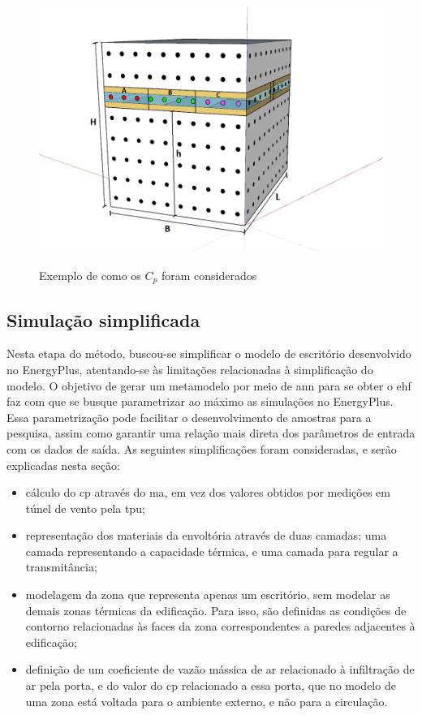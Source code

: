 \documentclass[brazil,hardcopy,openany]{ufscthesis} %
\begin{document}
\begin{figure}[h]
	\centering
	\caption{Exemplo de como os $C_p$ foram considerados}
	\includegraphics[width=.8\linewidth]{img/ex_TPU_h.png}
	\label{fig:tpuwindows}
\end{figure}


\subsection{Simulação simplificada}

Nesta etapa do método, buscou-se simplificar o modelo de escritório desenvolvido no EnergyPlus, atentando-se às limitações relacionadas à simplificação do modelo.
O objetivo de gerar um metamodelo por meio de \acrfull{ann} para se obter o \acrshort{ehf} faz com que se busque parametrizar ao máximo as simulações no EnergyPlus.
Essa parametrização pode facilitar o desenvolvimento de amostras para a pesquisa, assim como garantir uma relação mais direta dos parâmetros de entrada com os dados de saída. 
As seguintes simplificações foram consideradas, e serão explicadas nesta seção:

\begin{itemize}
	\item cálculo do \acrshort{cp} através do \acrlong{ma}, em vez dos valores obtidos por medições em túnel de vento pela \acrshort{tpu};
	\item representação dos materiais da envoltória através de duas camadas: uma camada representando a capacidade térmica, e uma camada para regular a transmitância;  %
	\item modelagem da zona que representa apenas um escritório, sem modelar as demais zonas térmicas da edificação. Para isso, são definidas as condições de contorno relacionadas às faces da zona correspondentes a paredes adjacentes à edificação;
	\item definição de um coeficiente de vazão mássica de ar relacionado à infiltração de ar pela porta, e do valor do \acrshort{cp} relacionado a essa porta, que no modelo de uma zona está voltada para o ambiente externo, e não para a circulação.
\end{itemize}
\end{document}
